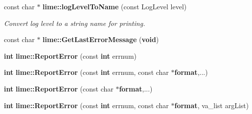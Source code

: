 \begin{DoxyCompactItemize}
\item 
const char $\ast$ {\bf lime\+::log\+Level\+To\+Name} (const Log\+Level level)
\begin{DoxyCompactList}\small\item\em Convert log level to a string name for printing. \end{DoxyCompactList}\item 
const char $\ast$ {\bf lime\+::\+Get\+Last\+Error\+Message} ({\bf void})
\item 
{\bf int} {\bf lime\+::\+Report\+Error} (const {\bf int} errnum)
\item 
{\bf int} {\bf lime\+::\+Report\+Error} (const {\bf int} errnum, const char $\ast${\bf format},...)
\item 
{\bf int} {\bf lime\+::\+Report\+Error} (const char $\ast${\bf format},...)
\item 
{\bf int} {\bf lime\+::\+Report\+Error} (const {\bf int} errnum, const char $\ast${\bf format}, va\+\_\+list arg\+List)
\end{DoxyCompactItemize}
